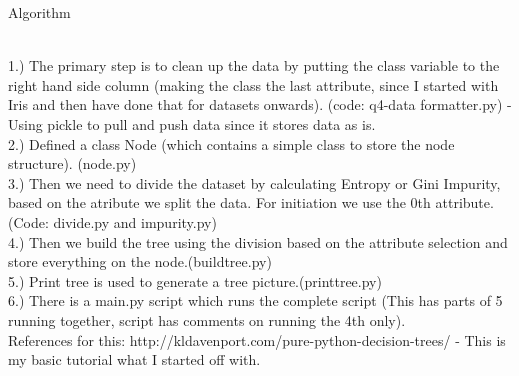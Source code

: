 \documentclass[12pt,a4paper,titlepage]{article}
\begin{document}
{{{{\centerline{Algorithm}~\\
1.) The primary step is to clean up the data by putting the class variable to the right hand side column (making the class the last attribute, since I started with Iris and then have done that for datasets onwards). (code: q4-data formatter.py) - Using pickle to pull and push data since it stores data as is.\\
2.) Defined a class Node (which contains a simple class to store the node structure). (node.py)\\
3.) Then we need to divide the dataset by calculating Entropy or Gini Impurity, based on the atribute we split the data. For initiation we use the 0th attribute. (Code: divide.py and impurity.py)\\
4.) Then we build the tree using the division based on the attribute selection and store everything on the node.(buildtree.py)\\
5.) Print tree is used to generate a tree picture.(printtree.py)\\
6.) There is a main.py script which runs the complete script (This has parts of 5 running together, script has comments on running the 4th only).\\
References for this: http://kldavenport.com/pure-python-decision-trees/ - This is my basic tutorial what I started off with.\\~\\
}
}}}
\end{document}
